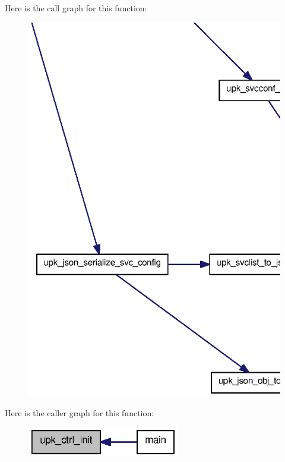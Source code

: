 Here is the call graph for this function:
\nopagebreak
\begin{figure}[H]
\begin{center}
\leavevmode
\includegraphics[width=400pt]{controller_2controller_8c_a253734ff940e671ba2bd35fc159a9471_cgraph}
\end{center}
\end{figure}




Here is the caller graph for this function:\nopagebreak
\begin{figure}[H]
\begin{center}
\leavevmode
\includegraphics[width=188pt]{controller_2controller_8c_a253734ff940e671ba2bd35fc159a9471_icgraph}
\end{center}
\end{figure}


